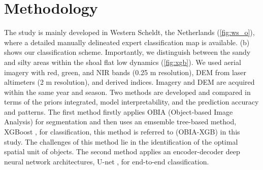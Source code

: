 \documentclass{isprs} %
\begin{document}
\section{Methodology}\label{method}
 
The study is mainly developed in Western Scheldt, the Netherlands (\cref{fig:ws_o}), where a detailed manually delineated expert classification map is available. 
 (b) shows our classification scheme. Importantly, we distinguish between the sandy and silty areas within the shoal flat low dynamics (\cref{fig:xgb}). We used aerial imagery with red, green, and NIR bands (0.25 m resolution), DEM from laser altimeters (2 m resolution), and derived indices. Imagery and DEM are acquired within the same year and season. Two methods are developed and compared in terms of the priors integrated, model interpretability, and the prediction accuracy and patterns. The first method firstly applies OBIA (Object-based Image Analysis) for segmentation and then uses an emsemble tree-based method, XGBoost \citep{Chen:2016:XST:2939672.2939785}, for classification, this method is referred to (OBIA-XGB) in this study. The challenges of this method lie in the identification of the optimal spatial unit of objects. The second method applies an encoder-decoder deep neural network architectures, U-net \citep{ronneberger2015u}, for end-to-end classification. 




\end{document}
